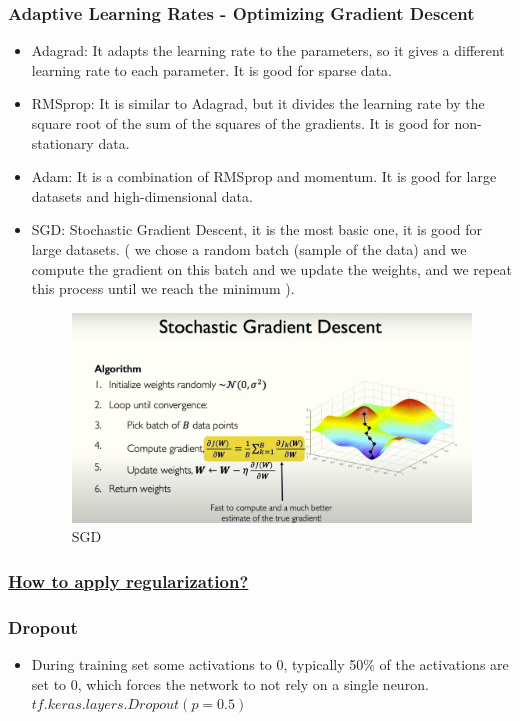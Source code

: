 \documentclass{article}
\begin{document}
\subsubsection*{Adaptive Learning Rates - Optimizing Gradient Descent}
\begin{itemize}
  \item Adagrad: It adapts the learning rate to the parameters, so it gives a different learning rate to each parameter. It is good for sparse data.
  \item RMSprop: It is similar to Adagrad, but it divides the learning rate by the square root of the sum of the squares of the gradients. It is good for non-stationary data.
  \item Adam: It is a combination of RMSprop and momentum. It is good for large datasets and high-dimensional data.
  \item SGD: Stochastic Gradient Descent, it is the most basic one, it is good for large datasets. ( we chose a random batch (sample of the data) and we compute the gradient on this batch and we update the weights, and we repeat this process until we reach the minimum ).
  \begin{figure}[H]
    \centering
    \includegraphics[width = \textwidth]{Images/SGD.png}
    \caption{SGD}
  \end{figure}
\end{itemize}
\subsubsection*{\underline{How to apply regularization?}}
\subsubsection{Dropout}
\begin{itemize}
  \item During training set some activations to 0, typically 50\% of the activations are set to 0, which forces the network to not rely on a single neuron. $tf.keras.layers.Dropout(p=0.5)$
\end{itemize}
\end{document}
